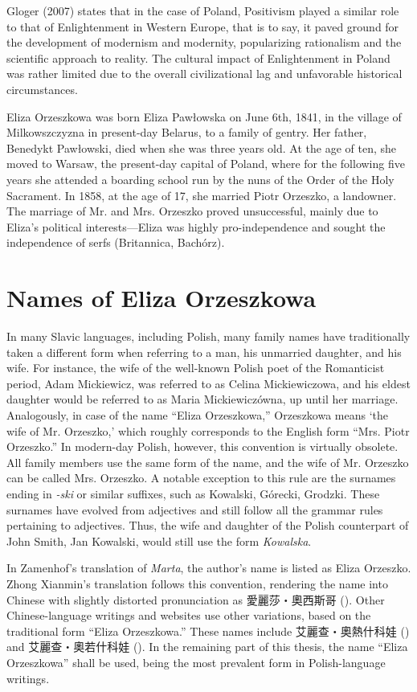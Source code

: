 Gloger (2007) states that in the case of Poland, Positivism played a similar role to that of Enlightenment in Western Europe, that is to say, it paved ground for the development of modernism and modernity, popularizing rationalism and the scientific approach to reality. The cultural impact of Enlightenment in Poland was rather limited due to the overall civilizational lag and unfavorable historical circumstances.

Eliza Orzeszkowa was born Eliza Pawłowska on June 6th, 1841, in the village of Milkowszczyzna in present-day Belarus, to a family of gentry. Her father, Benedykt Pawłowski, died when she was three years old. 
At the age of ten, she moved to Warsaw, the present-day capital of Poland, where for the following five years she attended a boarding school run by the nuns of the Order of the Holy Sacrament.
In 1858, at the age of 17, she married Piotr Orzeszko, a landowner.
The marriage of Mr. and Mrs. Orzeszko proved unsuccessful, mainly due to Eliza's political interests---Eliza was highly pro-independence and sought the independence of serfs (Britannica, Bachórz).

\section{Names of Eliza Orzeszkowa}
In many Slavic languages, including Polish, many family names have traditionally taken a different form when referring to a man, his unmarried daughter, and his wife.
For instance, the wife of the well-known Polish poet of the Romanticist period, Adam Mickiewicz, was referred to as Celina Mickiewiczowa, and his eldest daughter would be referred to as Maria Mickiewiczówna, up until her marriage.
Analogously, in case of the name ``Eliza Orzeszkowa,'' Orzeszkowa means `the wife of Mr. Orzeszko,' which roughly corresponds to the English form ``Mrs. Piotr Orzeszko.''
In modern-day Polish, however, this convention is virtually obsolete.
All family members use the same form of the name, and the wife of Mr. Orzeszko can be called Mrs. Orzeszko.
A notable exception to this rule are the surnames ending in \textit{-ski} or similar suffixes, such as Kowalski, Górecki, Grodzki.
These surnames have evolved from adjectives and still follow all the grammar rules pertaining to adjectives.
Thus, the wife and daughter of the Polish counterpart of John Smith, Jan Kowalski, would still use the form \textit{Kowalska}. 

In Zamenhof's translation of \textit{Marta}, the author's name is listed as Eliza Orzeszko.
Zhong Xianmin's translation follows this convention, rendering the name into Chinese with slightly distorted pronunciation as 愛麗莎・奧西斯哥 ().
Other Chinese-language writings and websites use other variations, based on the traditional form ``Eliza Orzeszkowa.''
These names include 艾麗查・奧熱什科娃 () and 艾麗查・奧若什科娃 (). In the remaining part of this thesis, the name ``Eliza Orzeszkowa'' shall be used, being the most prevalent form in Polish-language writings.


